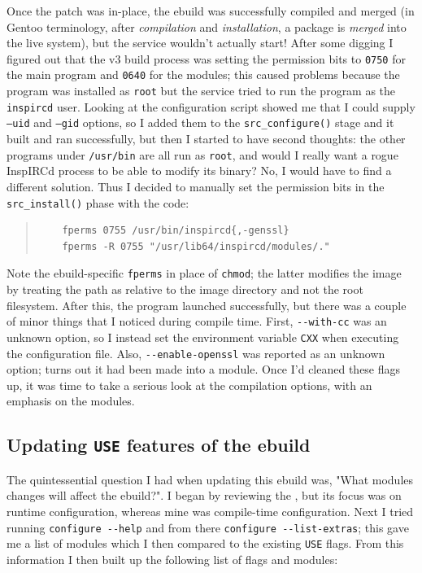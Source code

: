 \documentclass{article}
\begin{document}
Once the patch was in-place, the ebuild was successfully compiled and merged (in Gentoo terminology, after \emph{compilation} and \emph{installation}, a package is \emph{merged} into the live system), but the service wouldn't actually start!  After some digging I figured out that the v3 build process was setting the permission bits to \texttt{0750} for the main program and \texttt{0640} for the modules; this caused problems because the program was installed as \texttt{root} but the service tried to run the program as the \texttt{inspircd} user.  Looking at the configuration script showed me that I could supply \texttt{--uid} and \texttt{--gid} options, so I added them to the \texttt{src_configure()} stage and it built and ran successfully, but then I started to have second thoughts: the other programs under \texttt{/usr/bin} are all run as \texttt{root}, and would I really want a rogue InspIRCd process to be able to modify its binary?  No, I would have to find a different solution.  Thus I decided to manually set the permission bits in the \texttt{src_install()} phase with the code:

\begin{quote}
\begin{verbatim}
	fperms 0755 /usr/bin/inspircd{,-genssl}
	fperms -R 0755 "/usr/lib64/inspircd/modules/."
\end{verbatim}
\end{quote}

Note the ebuild-specific \texttt{fperms} in place of \texttt{chmod}; the latter modifies the image by treating the path as relative to the image directory and not the root filesystem.  After this, the program launched successfully, but there was a couple of minor things that I noticed during compile time.  First, \verb|--with-cc| was an unknown option, so I instead set the environment variable \texttt{CXX} when executing the configuration file.  Also, \verb|--enable-openssl| was reported as an unknown option; turns out it had been made into a module.  Once I'd cleaned these flags up, it was time to take a serious look at the compilation options, with an emphasis on the modules.

\subsection{Updating \texttt{USE} features of the ebuild}
The quintessential question I had when updating this ebuild was, "What modules changes will affect the ebuild?".  I began by reviewing the , but its focus was on runtime configuration, whereas mine was compile-time configuration.  Next I tried running \verb|configure --help| and from there \verb|configure --list-extras|; this gave me a list of modules which I then compared to the existing \texttt{USE} flags.  From this information I then built up the following list of flags and modules:
\end{document}
